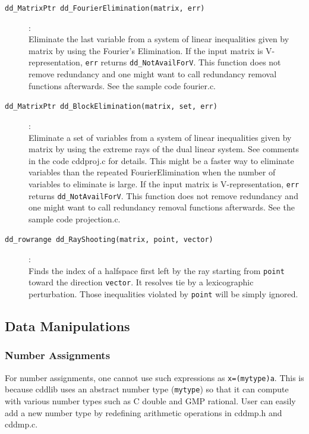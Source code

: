 \documentclass[11pt]{article}
\newcommand {\0} {{\bf 0}}
\begin{document}
\begin{description}
\item[{\tt dd\_MatrixPtr dd\_FourierElimination(matrix, err)}]:\\
Eliminate the last variable from a system of linear inequalities
given by matrix by using the Fourier's Elimination.  If the
input matrix is V-representation, {\tt  *err} returns
{\tt dd\_NotAvailForV}.   This function does not
remove redundancy  and one might want to call
redundancy removal functions afterwards. See the sample code fourier.c.

\item[{\tt dd\_MatrixPtr dd\_BlockElimination(matrix, set, err)}]:\\
Eliminate a set of variables from a system of linear inequalities
given by matrix by using the extreme rays of the dual linear system.
See comments in the code cddproj.c for details.  This might be
a faster way to eliminate variables than the repeated FourierElimination when
the number of variables to eliminate is large.
If the input matrix is V-representation, {\tt  *err}  returns {\tt dd\_NotAvailForV}.
This function does not remove redundancy  and one might want to call
redundancy removal functions afterwards. See the sample code projection.c.


\item[{\tt dd\_rowrange dd\_RayShooting(matrix, point, vector)}]:\\
Finds the index of a halfspace first left by the ray starting from
{\tt point} toward the direction {\tt vector}.  It resolves
tie by a lexicographic perturbation.  Those inequalities violated
by {\tt point} will be simply ignored.

\end{description}


\subsection{Data Manipulations}  \label{DataLibrary}

\subsubsection{Number Assignments}
For number assignments, one cannot use such expressions as {\tt x=(mytype)a}.
This is because cddlib uses an abstract number type ({\tt mytype})
so that it can compute with various
number types such as C double and GMP rational.
User can easily add a new number type by redefining
arithmetic operations in cddmp.h and cddmp.c.
\end{document}
